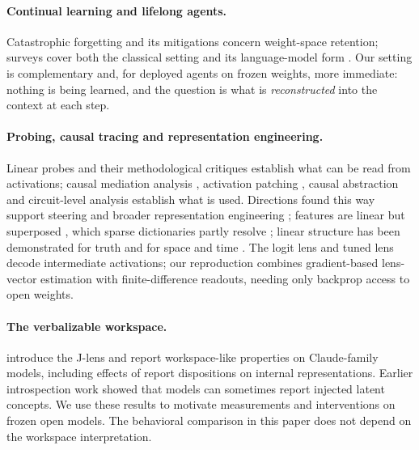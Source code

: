 \documentclass{article}
\newcommand{\jlens}{J\mbox{-}lens}
\begin{document}
\paragraph{Continual learning and lifelong agents.} Catastrophic forgetting \citep{french1999catastrophic} and its mitigations \citep{kirkpatrick2017ewc} concern weight-space retention; surveys cover both the classical setting \citep{parisi2019continual} and its language-model form \citep{wang2024continualsurvey}. Our setting is complementary and, for deployed agents on frozen weights, more immediate: nothing is being learned, and the question is what is \emph{reconstructed} into the context at each step.

\paragraph{Probing, causal tracing and representation engineering.} Linear probes \citep{alain2017probes} and their methodological critiques \citep{hewitt2019control,belinkov2022probing} establish what can be read from activations; causal mediation analysis \citep{vig2020causal}, activation patching \citep{meng2022rome}, causal abstraction \citep{geiger2021causal} and circuit-level analysis \citep{wang2023ioi} establish what is used. Directions found this way support steering \citep{turner2023,rimsky2024,li2023iti} and broader representation engineering \citep{zou2023repe}; features are linear but superposed \citep{elhage2022}, which sparse dictionaries partly resolve \citep{bricken2023monosemanticity,templeton2024scaling}; linear structure has been demonstrated for truth \citep{marks2024geometry} and for space and time \citep{gurnee2024space}. The logit lens \citep{nostalgebraist2020} and tuned lens \citep{belrose2023} decode intermediate activations; our reproduction combines gradient-based lens-vector estimation with finite-difference readouts, needing only backprop access to open weights.

\paragraph{The verbalizable workspace.} \citet{gurnee2026} introduce the \jlens{} and report workspace-like properties on Claude-family models, including effects of report dispositions on internal representations. Earlier introspection work \citep{lindsey2025} showed that models can sometimes report injected latent concepts. We use these results to motivate measurements and interventions on frozen open models. The behavioral comparison in this paper does not depend on the workspace interpretation.
\end{document}
